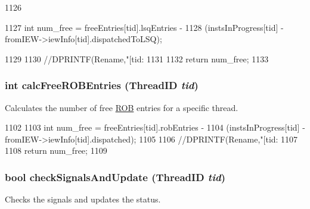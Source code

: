 \begin{DoxyCode}
1126 {
1127     int num_free = freeEntries[tid].lsqEntries -
1128                   (instsInProgress[tid] - fromIEW->iewInfo[tid].dispatchedToLSQ);
      
1129 
1130     //DPRINTF(Rename,"[tid:%
1131 
1132     return num_free;
1133 }
\end{DoxyCode}
\hypertarget{classDefaultRename_a6367314e59f9295e1bf57419938874c5}{
\subsubsection[{calcFreeROBEntries}]{\setlength{\rightskip}{0pt plus 5cm}int calcFreeROBEntries ({\bf ThreadID} {\em tid})}}
\label{classDefaultRename_a6367314e59f9295e1bf57419938874c5}
Calculates the number of free \hyperlink{classROB}{ROB} entries for a specific thread. 


\begin{DoxyCode}
1102 {
1103     int num_free = freeEntries[tid].robEntries -
1104                   (instsInProgress[tid] - fromIEW->iewInfo[tid].dispatched);
1105 
1106     //DPRINTF(Rename,"[tid:%
1107 
1108     return num_free;
1109 }
\end{DoxyCode}
\hypertarget{classDefaultRename_af77f2bf38a75182c65e633b9fdf295d2}{
\subsubsection[{checkSignalsAndUpdate}]{\setlength{\rightskip}{0pt plus 5cm}bool checkSignalsAndUpdate ({\bf ThreadID} {\em tid})}}
\label{classDefaultRename_af77f2bf38a75182c65e633b9fdf295d2}
Checks the signals and updates the status. 


